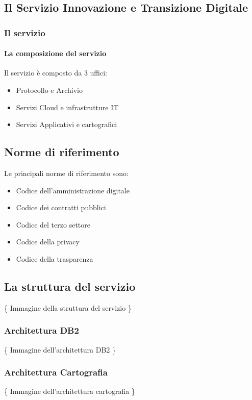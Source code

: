         \subsection{Il Servizio Innovazione e Transizione Digitale}
            \subsubsection{Il servizio}
                \paragraph{La composizione del servizio} Il servizio è composto da 3 uffici:
                    \begin{itemize}
                        \item Protocollo e Archivio
                        \item Servizi Cloud e infrastrutture IT
                        \item Servizi Applicativi e cartografici
                    \end{itemize}
        \subsection{Norme di riferimento} Le principali norme di riferimento sono:
            \begin{itemize}
                \item Codice dell'amministrazione digitale
                \item Codice dei contratti pubblici
                \item Codice del terzo settore
                \item Codice della privacy
                \item Codice della trasparenza
            \end{itemize}
        \subsection{La struttura del servizio}
            \{ Immagine della struttura del servizio \}
            \subsubsection{Architettura DB2}
                \{ Immagine dell'architettura DB2 \}
            \subsubsection{Architettura Cartografia}
                \{ Immagine dell'architettura cartografia \}
